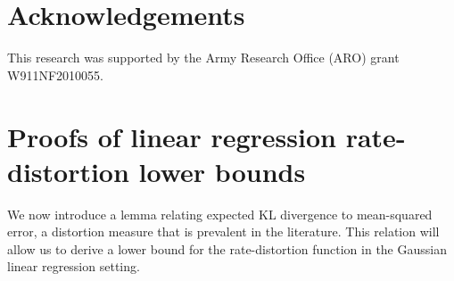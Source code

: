 \documentclass[twoside,11pt]{article}
\begin{document}
\section*{Acknowledgements}

This research was supported by the Army Research Office (ARO) grant W911NF2010055.

\vskip 0.2in


\appendix
\section{Proofs of linear regression rate-distortion lower bounds}
\label{apdx:lin_reg_lb}
We now introduce a lemma relating expected KL divergence to mean-squared error, a distortion measure that is prevalent in the literature. This relation will allow us to derive a lower bound for the rate-distortion function in the Gaussian linear regression setting.
\end{document}
